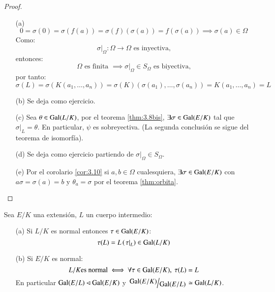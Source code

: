 \begin{proof}$ $
    \begin{itemize}
        \item[(a)]
        $$
            0 = \sigma(0) = \sigma(f(a)) = \sigma(f)(\sigma(a)) = f(\sigma(a)) \implies \sigma(a) \in \Omega
        $$
        Como:
        $$
            \left. \sigma \right|_\Omega: \Omega \to \Omega \text{ es inyectiva,}
        $$
        entonces:
        $$
            \Omega \text{ es finita } \implies \left. \sigma \right|_\Omega \in S_\Omega \text{ es biyectiva,}
        $$
        por tanto:
        $$
            \sigma(L) = \sigma(K(a_1, \ldots, a_n)) = \sigma(K)(\sigma(a_1), \ldots, \sigma(a_n)) = K(a_1, \ldots, a_n) = L
        $$
        \item[(b)] Se deja como ejercicio.
        \item[(c)] Sea $\theta \in \mathrm{Gal}(L/K)$, por el teorema \ref{thm:3.8bis}, $\exists \sigma \in \mathrm{Gal}(E/K)$ tal que $\left. \sigma \right|_L = \theta$. En particular, $\psi$ es sobreyectiva. (La segunda conclusión se sigue del teorema de isomorfía).
        \item[(d)] Se deja como ejercicio partiendo de $\left. \sigma \right|_\Omega \in S_\Omega$.
        \item[(e)] Por el corolario \ref{cor:3.10} si $a, b \in \Omega$ cualesquiera, $\exists \sigma \in \mathrm{Gal}(E/K)$ con $a\sigma = \sigma(a) = b$ y $\theta_a = \sigma$ por el teorema \ref{thm:orbita}.
    \end{itemize}
\end{proof}


\begin{cor}\label{cor:3.12}
    Sea $E/K$ una extensión, $L$ un cuerpo intermedio:
    \begin{itemize}
        \item[(a)] Si $L/K$ es normal entonces $\tau \in \mathrm{Gal}(E/K)$:
        $$
            \tau(L) = L \left(\left.\tau\right|_L\right) \in \mathrm{Gal}(L/K)
        $$
        \item[(b)] Si $E/K$ es normal:
        $$
            L/K \text{es normal} \iff \forall \tau \in \mathrm{Gal}(E/K),\ \tau(L) = L
        $$
        En particular $\mathrm{Gal}(E/L) \lhd \mathrm{Gal}(E/K)$ y $\quo{\gal(E/K)}{\gal(E/L)} \isom \gal(L/K)$.
    \end{itemize}
\end{cor}


